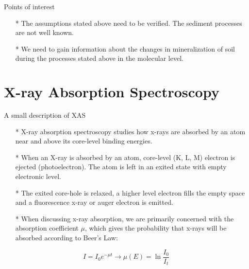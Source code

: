 \documentclass{beamer}
\begin{document}
  \begin{frame}{Points of interest}
  \begin{itemize}
    \item[*] The assumptions stated above need to be verified. The sediment processes are not well known. 
    \item[*] We need to gain information about the changes in mineralization of soil during the processes stated above in the molecular level.
  \end{itemize}
  \end{frame}
  
  \section{X-ray Absorption Spectroscopy}
  \begin{frame}{A small description of XAS}
  \begin{itemize}
    \item[*] X-ray absorption spectroscopy studies how x-rays are absorbed by an atom near and above its core-level binding energies.
    \item[*] When an X-ray is absorbed by an atom, core-level (K, L, M) electron is ejected (photoelectron). The atom is left in an exited state with empty electronic level.
    \item[*] The exited core-hole is relaxed, a higher level electron fills the empty space and a fluorescence x-ray or auger electron is emitted.
    \item[*] When discussing x-ray absorption, we are primarily concerned with the absorption coefficient $\mu$, which gives the probability that x-rays will be absorbed according to Beer's Law:   
  \end{itemize}
  \begin{equation}
  I=I_0e^{-\mu t} \rightarrow \mu(E)=\ln{\frac{I_0}{I_t}}
  \end{equation}
  \end{frame}
  
\end{document}
